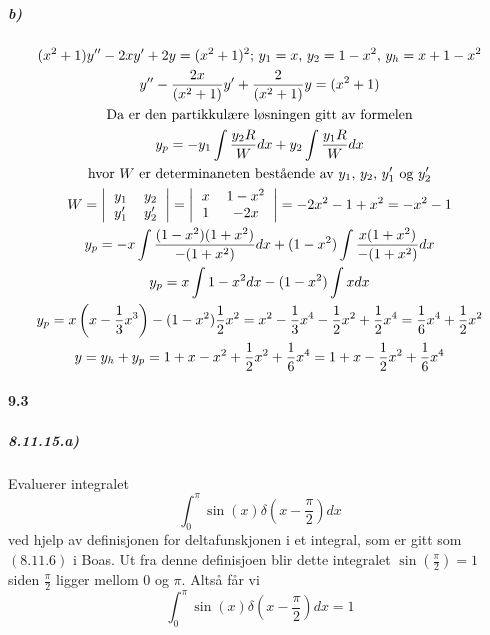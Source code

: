 \documentclass[11pt, A4paper,norsk]{article}
\begin{document}
			\subparagraph{b)}
				\begin{gather*}
(x^2 + 1) y'' - 2 x y' + 2 y = (x^2 + 1)^2 \text{; } y_1 = x \text{, } y_2 = 1 - x^2 \text{, } y_h = x + 1 - x^2 \\
y'' - \frac{2 x}{(x^2 + 1)} y' + \frac{2}{(x^2 + 1)} y = (x^2 + 1) \\
\text{Da er den partikkulære løsningen gitt av formelen} \\
y_p = - y_1 \int \frac{y_2 R}{W} dx + y_2 \int \frac{y_1 R}{W} dx \\
\text{hvor $W$ er determinaneten bestående av $y_1$, $y_2$, $y_1'$ og $y_2'$} \\
W = \left|
\begin{tabular}{ cc }
$y_1$ & $y_2$ \\
$y_1'$ & $y_2'$
\end{tabular}
\right| = \left|
\begin{tabular}{ cc }
$x$ & $1 - x^2$ \\
$1$ & $- 2 x$
\end{tabular}
\right| = - 2 x^2 - 1 + x^2 = - x^2 - 1 \\
y_p = - x \int \frac{(1 - x^2) (1 + x^2)}{- (1 + x^2)} dx + (1 - x^2) \int \frac{x (1 + x^2)}{- (1 + x^2)} dx \\
y_p = x \int 1 - x^2 dx - (1 - x^2) \int x dx \\
y_p = x \left( x - \frac{1}{3} x^3 \right) - (1 - x^2) \frac{1}{2} x^2 = x^2 - \frac{1}{3} x^4 - \frac{1}{2} x^2 + \frac{1}{2} x^4 = \frac{1}{6} x^4 + \frac{1}{2} x^2 \\
y = y_h + y_p = 1 + x - x^2 + \frac{1}{2} x^2 + \frac{1}{6} x^4 = 1 + x - \frac{1}{2} x^2 + \frac{1}{6} x^4
				\end{gather*}









		\paragraph{9.3}
			\subparagraph{8.11.15.a)}
				\begin{flushleft}
Evaluerer integralet
$$\int_{0}^{\pi} \sin(x) \delta\left( x - \frac{\pi}{2} \right) dx$$
ved hjelp av definisjonen for deltafunskjonen i et integral, som er gitt som $(8.11.6)$ i Boas. Ut fra denne definisjoen blir dette integralet $\sin\left( \frac{\pi}{2} \right) = 1$ siden $\frac{\pi}{2}$ ligger mellom $0$ og $\pi$. Altså får vi
$$\int_{0}^{\pi} \sin(x) \delta\left( x - \frac{\pi}{2} \right) dx = 1$$
				\end{flushleft}
\end{document}
